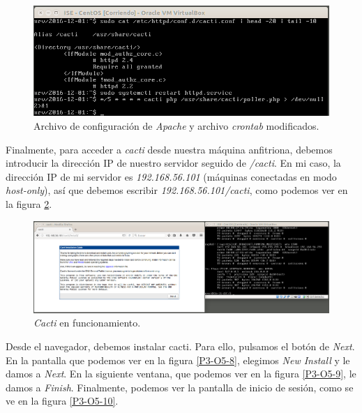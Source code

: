 \documentclass[a4paper,titlepage,12pt]{report}	%
\numberwithin{figure}{section} %
\numberwithin{table}{section} %
\begin{document}
	\begin{figure}[H]
	   \includegraphics[width=\linewidth]{./Imagenes/P3/O5-6.png}
	   \vspace{-0.5cm}
	   \caption[Archivo de configuración de \textit{Apache} y archivo \textit{crontab} modificados.]{Archivo de configuración de \textit{Apache} y archivo \textit{crontab} modificados.}
	   \label{P3-O5-6}
	\end{figure}

	Finalmente, para acceder a \textit{cacti} desde nuestra máquina anfitriona, debemos introducir la dirección IP de nuestro servidor seguido de \textit{/cacti}. En mi caso, la dirección IP de mi servidor es \textit{192.168.56.101} (máquinas conectadas en modo \textit{host-only}), así que debemos escribir \textit{192.168.56.101/cacti}, como podemos ver en la figura \ref{P3-O5-7}.

	\begin{figure}[H]
	   \includegraphics[width=\linewidth]{./Imagenes/P3/O5-7.png}
	   \vspace{-0.5cm}
	   \caption[\textit{Cacti} en funcionamiento.]{\textit{Cacti} en funcionamiento.}
	   \label{P3-O5-7}
	\end{figure}

	Desde el navegador, debemos instalar cacti. Para ello, pulsamos el botón de \textit{Next}. En la pantalla que podemos ver en la figura \ref{P3-O5-8}, elegimos \textit{New Install} y le damos a \textit{Next}. En la siguiente ventana, que podemos ver en la figura \ref{P3-O5-9}, le damos a \textit{Finish}. Finalmente, podemos ver la pantalla de inicio de sesión, como se ve en la figura \ref{P3-O5-10}.
\end{document}
